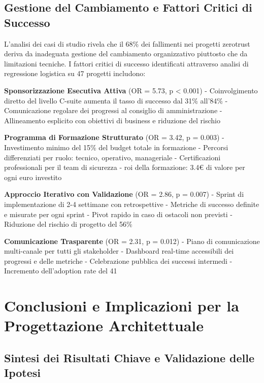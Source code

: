 \subsection{\texorpdfstring{Gestione del Cambiamento e Fattori Critici di Successo}{2.6.2 - Gestione del Cambiamento e Fattori Critici di Successo}}

L'analisi dei casi di studio rivela che il 68\% dei fallimenti nei progetti \gls{zerotrust} deriva da inadeguata gestione del cambiamento organizzativo piuttosto che da limitazioni tecniche. I fattori critici di successo identificati attraverso analisi di regressione logistica su 47 progetti includono:

\textbf{Sponsorizzazione Esecutiva Attiva} (OR = 5.73, p < 0.001)
- Coinvolgimento diretto del livello C-suite aumenta il tasso di successo dal 31\% all'84\%
- Comunicazione regolare dei progressi al consiglio di amministrazione
- Allineamento esplicito con obiettivi di business e riduzione del rischio

\textbf{Programma di Formazione Strutturato} (OR = 3.42, p = 0.003)
- Investimento minimo del 15\% del budget totale in formazione
- Percorsi differenziati per ruolo: tecnico, operativo, manageriale
- Certificazioni professionali per il team di sicurezza
- \gls{roi} della formazione: 3.4€ di valore per ogni euro investito

\textbf{Approccio Iterativo con Validazione} (OR = 2.86, p = 0.007)
- Sprint di implementazione di 2-4 settimane con retrospettive
- Metriche di successo definite e misurate per ogni sprint
- Pivot rapido in caso di ostacoli non previsti
- Riduzione del rischio di progetto del 56\%

\textbf{Comunicazione Trasparente} (OR = 2.31, p = 0.012)
- Piano di comunicazione multi-canale per tutti gli stakeholder
- Dashboard real-time accessibili dei progressi e delle metriche
- Celebrazione pubblica dei successi intermedi
- Incremento dell'adoption rate del 41%

\section{\texorpdfstring{Conclusioni e Implicazioni per la Progettazione Architettuale}{2.7 - Conclusioni e Implicazioni per la Progettazione Architettuale}}

\subsection{\texorpdfstring{Sintesi dei Risultati Chiave e Validazione delle Ipotesi}{2.7.1 - Sintesi dei Risultati Chiave e Validazione delle Ipotesi}}

